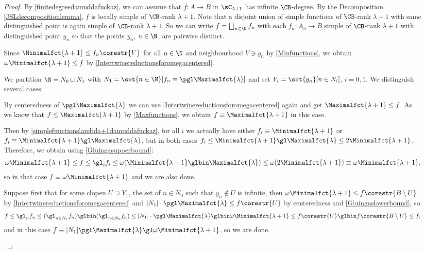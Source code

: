 \begin{proof}
By \cref{finitedegreedamuddafuckaz}, we can assume that $f:A\to B$ in $\sC_{\lambda+1}$ has infinite $\CB$-degree.
By the Decomposition \cref{JSLdecompositionlemma}, $f$ is locally simple of $\CB$-rank $\lambda+1$. {Note that a disjoint union of simple functions of $\CB$-rank $\lambda+1$ with same distinguished point is again simple of $\CB$-rank $\lambda+1$.} So we can write $f=\bigsqcup_{n\in\N}f_n$ with each $f_n:A_n\to B$ simple of $\CB$-rank $\lambda+1$ with distinguished point $y_n$ so that the points $y_n$, $n\in \N$, are pairwise distinct.  

Since $\Minimalfct{\lambda+1}\leq f_n\corestr{V}$ for all $n\in\N$ and neighbourhood $V\ni y_n$ by \cref{Minfunctions}, we obtain $\omega\Minimalfct{\lambda+1}\leq f$ by \cref{Intertwinereductionsforomegacentered}.

We partition $\N=N_0\sqcup N_1$ with $N_1=\set{n\in\N}[f_n\equiv\pgl\Maximalfct{\lambda}]$ and set $Y_i=\set{y_n}[n\in N_i]$, $i=0,1$. We distinguish several cases:

\begin{descThm}
\item[$N_1$ is infinite] By centeredness of $\pgl\Maximalfct{\lambda}$ we can use \cref{Intertwinereductionsforomegacentered} again and get $\Maximalfct{\lambda+1}\leq f$.
As we know that $f\leq\Maximalfct{\lambda+1}$ by \cref{Maxfunctions}, we obtain $f\equiv\Maximalfct{\lambda+1}$ in this case.

\item[$N_1$ is empty] Then by \cref{simplefunctionslambda+1damuddafuckaz}, for all $i$
we actually have either $f_i\equiv\Minimalfct{\lambda+1}$ or $f_i\equiv\Minimalfct{\lambda+1}\gl\Maximalfct{\lambda}$, but in both cases $f_i\leq\Minimalfct{\lambda+1}\gl\Maximalfct{\lambda}\leq 2 \Minimalfct{\lambda+1}$. Therefore, we obtain using \cref{Gluingasupperbound}:
\[\omega\Minimalfct{\lambda+1}\leq f\leq\gl_if_i\leq\omega(\Minimalfct{\lambda+1}\glbin\Maximalfct{\lambda})\leq\omega(2\Minimalfct{\lambda+1})\equiv\omega\Minimalfct{\lambda+1},\]
so in that case $f\equiv\omega\Minimalfct{\lambda+1}$ and we are also done.

\item[$N_1$ is finite and non empty] Suppose first that for some clopen $U\supseteq Y_1$, the set of $n\in N_0$ such that $y_n\notin U$ is infinite,
then $\omega\Minimalfct{\lambda+1}\leq f\corestr{B\setminus U}$ by \cref{Intertwinereductionsforomegacentered} and $|N_1|\cdot\pgl\Maximalfct{\lambda}\leq f\corestr{U}$ by centeredness and \cref{Gluingaslowerbound}, so
\[f\leq\gl_nf_n\leq (\gl_{n\in N_1}f_{n})\glbin(\gl_{n\in N_0}f_n)\leq|N_1|\cdot\pgl\Maximalfct{\lambda}\glbin\omega\Minimalfct{\lambda+1}\leq f\corestr{U}\glbin f\corestr{B\setminus U}\leq f,\]
and in this case $f\equiv|N_1|\pgl\Maximalfct{\lambda}\gl\omega\Minimalfct{\lambda+1}$, so we are done.


\end{descThm}
\end{proof}
